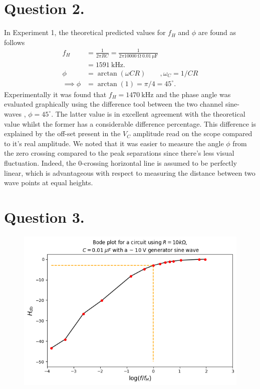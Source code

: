 \documentclass[
	12pt,
	]{article}
\theoremstyle{definition}
\theoremstyle{definition}
\theoremstyle{definition}
\theoremstyle{definition}
\theoremstyle{definition}
\theoremstyle{example}
\theoremstyle{note}
\theoremstyle{remark}
\theoremstyle{example}
\begin{document}
		\section*{Question 2.}
		In Experiment 1, the theoretical predicted values for $f_{H}$ and $\phi$ are found as follows
		\begin{align*}
			f_{H} &= \frac{1}{2\pi R C} = \frac{1}{2\pi 10000 \ \si{\ohm} \ 0.01 \ \si{\micro\farad}}\\
			&= 1591 \ \si{\kilo\hertz}.\\
			\phi &= \arctan(\omega C R) \qquad , \omega_{C} = 1/CR \\
			\implies \phi &= \arctan(1) = \pi / 4= 45 ^\circ.
		\end{align*}
		Experimentally it was found that $f_{H}  = 1470 \ \si{\kilo\hertz}$ and the phase angle was evaluated graphically using the difference tool between the two channel sine-waves , $\phi = 45 ^\circ$. The latter value is in excellent agreement with the theoretical value whilst the former has a considerable difference percentage. This difference is explained by the off-set present in the $V_C$ amplitude read on the scope compared to it's real amplitude. We noted that it was easier to measure the angle $\phi$ from the zero crossing compared to the peak separations since there's less visual fluctuation. Indeed, the $0$-crossing horizontal line is assumed to be perfectly linear, which is advantageous with respect to measuring the distance between two wave points at equal heights. 
		\section*{Question 3.}
			\begin{figure}[H]	
						\centering
						\includegraphics[width=0.9\linewidth]{phys241_lab3_picture2.png}
				\end{figure}
				
\end{document}
